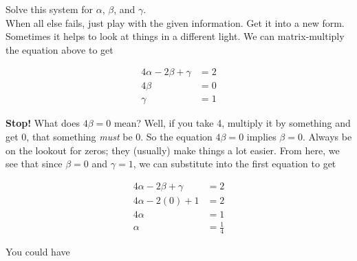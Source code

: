 \documentclass{article}
\def\a{\alpha}
\def\b{\beta}
\def\c{\gamma}
\begin{document}
Solve this system for $\a$, $\b$, and $\c$.\\

When all else fails, just play with the given information. Get it into a new form. Sometimes it helps to look at things in a different light. We can matrix-multiply the equation above to get


\begin{align*}
4 \a - 2 \b + \c &= 2 \\
4 \b &= 0 \\
\c & = 1
\end{align*}

\textbf{Stop!} What does $4 \b = 0$ mean? Well, if you take 4, multiply it by something and get 0, that something \textit{must} be 0. So the equation $4 \b = 0$ implies $\b = 0$. Always be on the lookout for zeros; they (usually) make things a lot easier. From here, we see that since $\b = 0$ and $\c = 1$, we can substitute into the first equation to get

\begin{align*}
4 \a - 2 \b + \c &= 2 \\
4 \a - 2 (0) + 1 &= 2 \\
4 \a &= 1 \\
\a &= \frac{1}{4}
\end{align*}

You could have 
\end{document}
